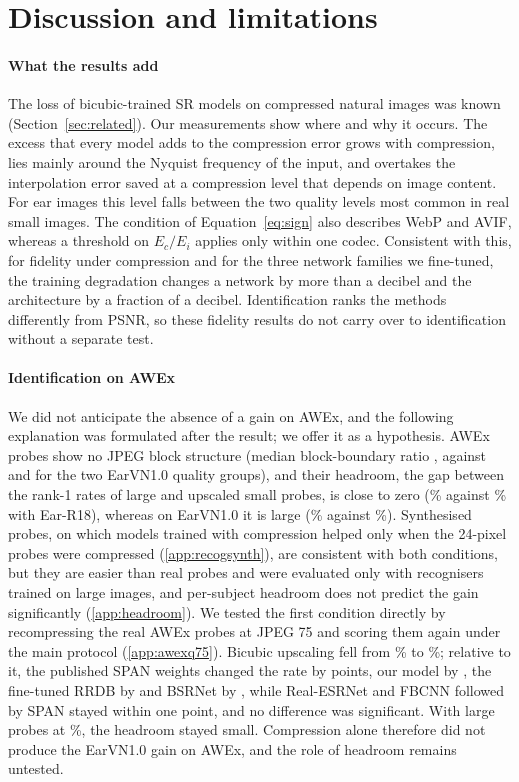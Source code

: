 \section{Discussion and limitations}
\label{sec:discussion}

\paragraph{What the results add} The loss of bicubic-trained SR models on compressed natural images was known (Section~\ref{sec:related}). Our measurements show where and why it occurs. The excess that every model adds to the compression error grows with compression, lies mainly around the Nyquist frequency of the input, and overtakes the interpolation error saved at a compression level that depends on image content. For ear images this level falls between the two quality levels most common in real small images. The condition of Equation~\ref{eq:sign} also describes WebP and AVIF, whereas a threshold on $E_c/E_i$ applies only within one codec. Consistent with this, for fidelity under compression and for the three network families we fine-tuned, the training degradation changes a network by more than a decibel and the architecture by a fraction of a decibel. Identification ranks the methods differently from PSNR, so these fidelity results do not carry over to identification without a separate test.

\paragraph{Identification on AWEx} We did not anticipate the absence of a gain on AWEx, and the following explanation was formulated after the result; we offer it as a hypothesis. AWEx probes show no JPEG block structure (median block-boundary ratio \BlockAwex{}, against \BlockEarvnLow{} and \BlockEarvnHigh{} for the two EarVN1.0 quality groups), and their headroom, the gap between the rank-1 rates of large and upscaled small probes, is close to zero (\RecAwexReRankRef{}\% against \RecAwexReRankBic{}\% with Ear-R18), whereas on EarVN1.0 it is large (\RecRankRef{}\% against \RecRankBic{}\%). Synthesised probes, on which models trained with compression helped only when the 24-pixel probes were compressed (\ref{app:recogsynth}), are consistent with both conditions, but they are easier than real probes and were evaluated only with recognisers trained on large images, and per-subject headroom does not predict the gain significantly (\ref{app:headroom}). We tested the first condition directly by recompressing the real AWEx probes at JPEG 75 and scoring them again under the main protocol (\ref{app:awexq75}). Bicubic upscaling fell from \AwexQBicOrig{}\% to \AwexQBic{}\%; relative to it, the published SPAN weights changed the rate by \AwexQPubPt{} points, our model by \AwexQEstPt{}, the fine-tuned RRDB by \AwexQRrdbPt{} and BSRNet by \AwexQBsrPt{}, while Real-ESRNet and FBCNN followed by SPAN stayed within one point, and no difference was significant. With large probes at \AwexQRef{}\%, the headroom stayed small. Compression alone therefore did not produce the EarVN1.0 gain on AWEx, and the role of headroom remains untested.

